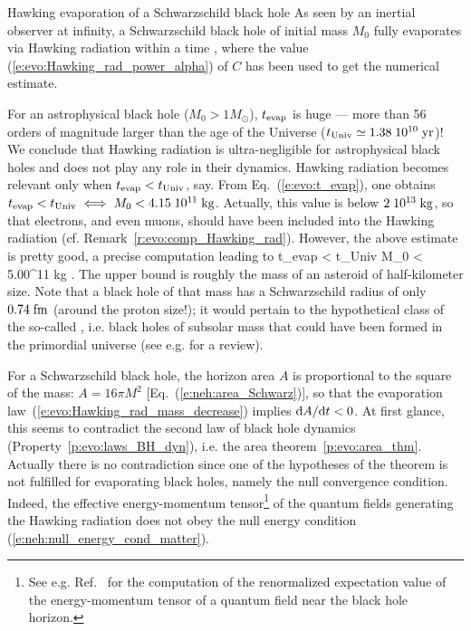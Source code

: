 \begin{tprop}{Hawking evaporation of a Schwarzschild black hole}{}
As seen by an inertial observer at infinity, a Schwarzschild black hole of initial mass $M_0$ fully evaporates via Hawking radiation within a time
\be \label{e:evo:t_evap}
     ,
\ee
where the value (\ref{e:evo:Hawking_rad_power_alpha}) of $C$ has been used
to get the numerical estimate.
\end{tprop}

For an astrophysical black hole ($M_0 >  1 M_\odot$), $t_{\rm evap} $ is
huge --- more than 56
orders of magnitude larger than the age of the Universe ($t_{\rm Univ} \simeq 1.38\; 10^{10} {\rm\; yr}$)!
We conclude that Hawking radiation is ultra-negligible
for astrophysical black holes and
does not play any role in their dynamics. Hawking radiation becomes relevant only when
$t_{\rm evap} < t_{\rm Univ}$, say. From Eq.~(\ref{e:evo:t_evap}), one obtains
$t_{\rm evap} < t_{\rm Univ} \iff M_0 < 4.15\; 10^{11} {\rm\; kg}$. Actually, this value
is below $2\; 10^{13}{\rm\; kg}$, so that electrons, and even muons, should have been included into the Hawking radiation
(cf. Remark~\ref{r:evo:comp_Hawking_rad}). However, the above estimate is pretty good, a precise computation leading to \cite{MacGiCP08}
\be
    t_{\rm evap} < t_{\rm Univ} \iff M_0 < 5.00^{11} {\rm\; kg} .
\ee
The upper bound is roughly the mass of an asteroid of half-kilometer size.
Note that a black hole of that mass has a Schwarzschild radius
of only $0.74{\rm \; fm}$ (around the proton size!); it
would pertain to the hypothetical class
of the so-called
,
i.e. black holes of subsolar mass that could have been formed in the primordial universe
(see e.g. \cite{CarrKSY21} for a review).

\begin{remark}
For a Schwarzschild black hole, the horizon area $A$ is proportional to the square
of the mass: $A = 16\pi M^2$ [Eq.~(\ref{e:neh:area_Schwarz})], so that
the evaporation law~(\ref{e:evo:Hawking_rad_mass_decrease}) implies $\mathrm{d} A / \mathrm{d} t < 0$.
At first glance,  this seems to contradict the second law of black hole dynamics
(Property~\ref{p:evo:laws_BH_dyn}), i.e. the
area theorem~\ref{p:evo:area_thm}.
Actually there is no contradiction since one of the hypotheses of
the theorem is not fulfilled for evaporating black holes, namely
the null convergence condition. Indeed, the effective energy-momentum tensor\footnote{See e.g.
Ref.~\cite{FroloT89} for the computation of the renormalized expectation value of the energy-momentum tensor of a quantum field near the black hole horizon.}
of the quantum fields generating the Hawking radiation does not obey the
null energy condition (\ref{e:neh:null_energy_cond_matter}).
\end{remark}

